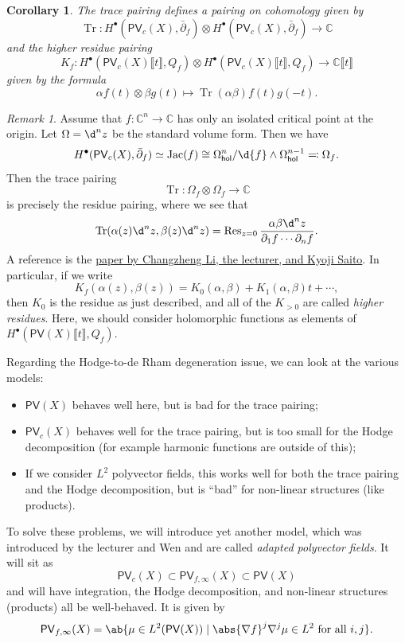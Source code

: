 \documentclass{amsart}
\newtheorem{cor}[thm]{Corollary}
\theoremstyle{definition}
\theoremstyle{remark}
\newtheorem{rmk}[thm]{Remark}
\theoremstyle{plain}
\theoremstyle{definition}
\theoremstyle{remark}
\newcommand{\C}{\mathbb{C}}
\newcommand{\on}[1]{\operatorname{#1}}
\newcommand{\ms}[1]{\mathsf{#1}}
\newcommand{\1}{\mathbf{1}}
\newcommand{\2}{\mathbf{2}}
\newcommand{\3}{\mathbf{3}}
\newcommand{\ps}[1]{\lBrack #1 \rBrack}
\newcommand{\dbar}{\bar{\partial}}
\begin{document}
\begin{cor}
    The trace pairing defines a pairing on cohomology given by
    \[ \on{Tr} \colon H^{\bullet}(\ms{PV}_c(X), \dbar_f) \otimes H^{\bullet}(\ms{PV}_c(X), \dbar_f) \to \C \]
    and the higher residue pairing
    \[ K_f \colon H^{\bullet}(\ms{PV}_c(X) \ps{t}, Q_f) \otimes H^{\bullet}(\ms{PV}_c(X) \ps{t}, Q_f) \to \C \ps{t} \] 
    given by the formula 
    \[ \alpha f(t) \otimes \beta g(t) \mapsto \on{Tr}(\alpha\beta) f(t) g(-t). \]
\end{cor}

\begin{rmk}
    Assume that \(f \colon \C^n \to \C\) has only an isolated critical point at the origin. Let \(\Omega = \d^n z\) be the standard volume form. Then we have
    \[ H^{\bullet}(\ms{PV}_c(X), \dbar_f) \simeq \on{Jac}(f) \cong \Omega^n_{\ms{hol}} / \d{f} \wedge \Omega^{n-1}_{\ms{hol}} \eqqcolon \Omega_f. \]
    Then the trace pairing
    \[ \on{Tr} \colon \Omega_f \otimes \Omega_f \to \C \]
    is precisely the residue pairing, where we see that
    \[ \on{Tr} (\alpha(z) \d^n z, \beta(z) \d^n z) = \on{Res}_{z = 0} \frac{\alpha \beta \d^n z}{\partial_1 f \cdots \partial_n f}. \]
    A reference is the \href{https://arxiv.org/pdf/1311.1659}{paper by Changzheng Li, the lecturer, and Kyoji Saito}. In particular, if we write
    \[ K_f (\alpha(z), \beta(z)) = K_0(\alpha, \beta) + K_1(\alpha, \beta) t + \cdots, \]
    then \(K_0\) is the residue as just described, and all of the \(K_{>0}\) are called \textit{higher residues}. Here, we should consider holomorphic functions as elements of \(H^{\bullet}(\ms{PV}(X) \ps{t}, Q_f)\). 
\end{rmk}

Regarding the Hodge-to-de Rham degeneration issue, we can look at the various models:
\begin{itemize}
    \item \(\ms{PV}(X)\) behaves well here, but is bad for the trace pairing;
    \item \(\ms{PV}_c(X)\) behaves well for the trace pairing, but is too small for the Hodge decomposition (for example harmonic functions are outside of this);
    \item If we consider \(L^2\) polyvector fields, this works well for both the trace pairing and the Hodge decomposition, but is ``bad'' for non-linear structures (like products).
\end{itemize}

To solve these problems, we will introduce yet another model, which was introduced by the lecturer and Wen and are called \textit{adapted polyvector fields}. It will sit as
\[ \ms{PV}_c(X) \subset \ms{PV}_{f, \infty}(X) \subset \ms{PV}(X) \]
and will have integration, the Hodge decomposition, and non-linear structures (products) all be well-behaved. It is given by
\[ \ms{PV}_{f, \infty}(X) = \ab\{ \mu \in L^2 (\ms{PV}(X)) \mid \abs{\nabla f}^j \nabla^j \mu \in L^2 \text{ for all } i, j \}. \]
\end{document}
